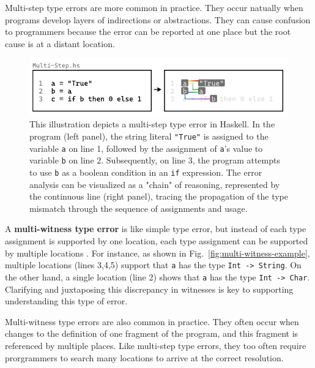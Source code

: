 \documentclass[pdflatex,sn-mathphys-num]{sn-jnl}%
\begin{document}
Multi-step type errors are more common in practice. They occur natually when programs develop layers of indirections or abstractions. They can cause confusion to programmers because the error can be reported at one place but the root cause is at a distant location. 

\begin{figure}[htbp]
  \includegraphics[width=\linewidth]{Multi-Step}
  \caption[This illustration depicts a multi-step type error in Haskell]{
    \label{fig:multi-step-example}
    This illustration depicts a multi-step type error in Haskell. In the program (left panel), the string literal \texttt{"True"} is assigned to the variable \texttt{a} on line 1, followed by the assignment of \texttt{a}'s value to variable \texttt{b} on line 2. Subsequently, on line 3, the program attempts to use \texttt{b} as a boolean condition in an \texttt{if} expression. The error analysis can be visualized as a "chain" of reasoning, represented by the continuous line (right panel), tracing the propagation of the type mismatch through the sequence of assignments and usage. }
\end{figure}

A \textbf{multi-witness type error} is like simple type error, but instead of each type assignment is supported by one location, each type assignment can be supported by multiple locations . For instance, as shown in Fig.~\ref{fig:multi-witness-example}, multiple locations (lines 3,4,5) support that {\tt a} has the type {\tt Int -> String}. On the other hand, a single location (line 2) shows that {\tt a} has the type {\tt Int -> Char}.  Clarifying and juxtaposing this discrepancy in witnesses is key to supporting understanding this type of error.

Multi-witness type errors are also common in practice. They often occur when changes to the definition of one fragment of the program, and this fragment is referenced by multiple places. Like multi-step type errors, they too often require prorgrammers to search many locations to arrive at the correct resolution.
\end{document}
